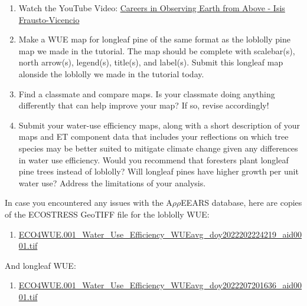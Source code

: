 \documentclass[oneside,a4paper,11pt,explicit]{book}
\begin{document}
\begin{tcolorbox}[colback=yellow!5!white,colframe=MACred,title= \vspace{.2em} \Large Make a Map Assignments]
	\large
	\begin{enumerate}
		\item Watch the YouTube Video: \href{https://www.youtube.com/watch?v=BViEWvhTgdw}{Careers in Observing Earth from Above - Isis Frausto-Vicencio}
        \item Make a WUE map for longleaf pine of the same format as the loblolly pine map we made in the tutorial. The map should be complete with scalebar(s), north arrow(s), legend(s), title(s), and label(s). Submit this longleaf map alonside the loblolly we made in the tutorial today.
        \item Find a classmate and compare maps. Is your classmate doing anything differently that can help improve your map? If so, revise accordingly! 
        \item Submit your water-use efficiency maps, along with a short description of your maps and ET component data that includes your reflections on which tree species may be better suited to mitigate climate change given any differences in water use efficiency. Would you recommend that foresters plant longleaf pine trees instead of loblolly? Will longleaf pines have higher growth per unit water use? Address the limitations of your analysis.
	\end{enumerate}
\end{tcolorbox}

\begin{tcolorbox}[colback=yellow!5!white,title=\textbf{Datafiles}]
	\large
	In case you encountered any issues with the A$\rho\rho$EEARS database, here are copies of the ECOSTRESS GeoTIFF file for the loblolly WUE:
	\begin{enumerate}
		\item \href{https://jeremydforsythe.github.io/icecream-tutorials/Tutorial9_WaterUseEfficiency/ECO4WUE.001_Water_Use_Efficiency_WUEavg_doy2022202224219_aid0001.tif}{\small ECO4WUE.001\_Water\_Use\_Efficiency\_WUEavg\_doy2022202224219\_aid0001.tif}
	\end{enumerate}
	And longleaf WUE:
	\begin{enumerate}
		\item \href{https://jeremydforsythe.github.io/icecream-tutorials/Tutorial9_WaterUseEfficiency/ECO4WUE.001_Water_Use_Efficiency_WUEavg_doy2022207201636_aid0001.tif}{\small ECO4WUE.001\_Water\_Use\_Efficiency\_WUEavg\_doy2022207201636\_aid0001.tif}
	\end{enumerate}
\end{tcolorbox}
\end{document}
